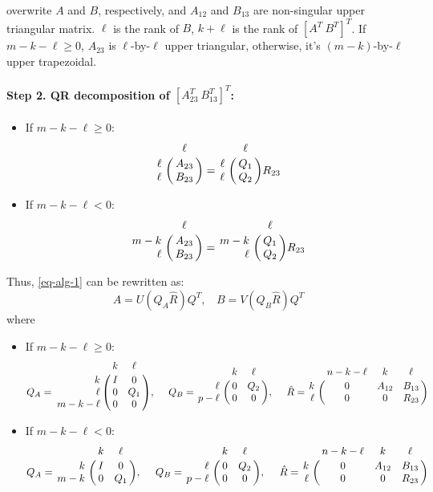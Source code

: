             \noindent overwrite $A$ and $B$, respectively, and 
            $A_{12}$ and $B_{13}$ are non-singular upper triangular matrix. 
            $\ell$ is the rank of $B$, $k+\ell$ is the rank of $[A^T \ B^T]^T$. 
            If $m-k-\ell \geq 0$, $A_{23}$ is $\ell$-by-$\ell$ upper triangular, 
            otherwise, it's $(m-k)$-by-$\ell$ upper trapezoidal. 
        

\paragraph{Step 2. QR decomposition of $[A_{23}^{T} \ B_{13}^{T}]^T$:} 

    \begin{itemize}
    	\item If $m-k-\ell \geq 0$:
	    	\[
                \bordermatrix{ & \ell  \cr
                    \hfill \ell & A_{23}  \cr
                    \hfill \ell & B_{23} \cr} = 
                \bordermatrix{ & \ell  \cr
                    \hfill \ell & Q_{1}  \cr
                    \hfill \ell & Q_{2} \cr}R_{23}   
        	\]
    	\item If $m-k-\ell < 0$:  
			\[
                \bordermatrix{ & \ell  \cr
                    \hfill m-k & A_{23}  \cr
                    \hfill \ell & B_{23} \cr} = 
                \bordermatrix{ & \ell  \cr
                    \hfill m-k & Q_{1}  \cr
                    \hfill \ell & Q_{2} \cr}R_{23}   
        	\]          
    \end{itemize}
            Thus, \eqref {eq-alg-1} can be rewritten as:
            \begin{equation} \label{eq-alg-2}
                A = U(Q_{A}\hat{R})Q^{T}, \ \ \ \ B = V(Q_{B}\hat{R})Q^{T}
            \end{equation}
            where 
            \begin{itemize}
            	\item If $m-k-\ell \geq 0$:
					\[
                        Q_{A} = \bordermatrix{ & k & \ell \cr
                        \hfill k & I & 0 \cr
                        \hfill \ell & 0 & Q_1 \cr
                        \hfill m-k-\ell & 0 & 0}, \  \ \ \
                        Q_{B} = \bordermatrix{ & k & \ell   \cr
                        \hfill \ell & 0 & Q_2\cr
                        \hfill p-\ell & 0 & 0}, \ \ \ \
                        \hat{R} = \bordermatrix{ & n-k-\ell & k & \ell \cr
                        \hfill k & 0 & A_{12} & B_{13} \cr
                        \hfill \ell & 0 & 0 & R_{23}}
            		\]
				\item If $m-k-\ell < 0$:  
					\[
                        Q_{A} = \bordermatrix{ & k & \ell \cr
                        \hfill k & I & 0 \cr
                        \hfill m-k & 0 & Q_1}, \  \ \ \
                        Q_{B} = \bordermatrix{ & k & \ell   \cr
                        \hfill \ell & 0 & Q_2\cr
                        \hfill p-\ell & 0 & 0}, \ \ \ \
                        \hat{R} = \bordermatrix{ & n-k-\ell & k & \ell \cr
                        \hfill k & 0 & A_{12} & B_{13} \cr
                        \hfill \ell & 0 & 0 & R_{23}}
            		\]
            \end{itemize}
        
